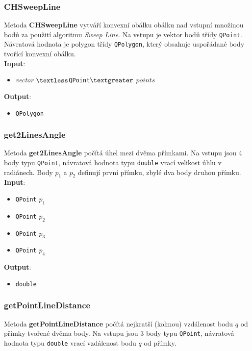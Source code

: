 \documentclass[a4paper, 12pt]{article}
\begin{document}
\subsubsection*{CHSweepLine}
Metoda \textbf{CHSweepLine} vytváří konvexní obálku obálku nad vstupní množinou bodů za použití algoritmu \textit{Sweep Line}. Na vstupu je vektor bodů třídy \texttt{QPoint}. Návratová hodnota je polygon třídy \texttt{QPolygon}, který obsahuje uspořádané body tvořící konvexní obálku.\\

\textbf{Input}:
\begin{itemize}
\item \textsl{vector} $\textless$\texttt{QPoint}$\textgreater$ $points$
\end{itemize}

\textbf{Output}:
\begin{itemize}
\item \texttt{QPolygon}
\end{itemize}

\subsubsection*{get2LinesAngle}
Metoda \textbf{get2LinesAngle} počítá úhel mezi dvěma přímkami. Na vstupu jsou 4 body typu \texttt{QPoint}, návratová hodnota typu \texttt{double} vrací velikost úhlu v radiánech. Body $p_1$ a $p_2$ definují první přímku, zbylé dva body druhou přímku.\\

\textbf{Input}:
\begin{itemize}
\item \texttt{QPoint} $p_1$ 
\item \texttt{QPoint} $p_2$ 
\item \texttt{QPoint} $p_3$
\item \texttt{QPoint} $p_4$
\end{itemize}

\textbf{Output}:
\begin{itemize}
\item \texttt{double} 
\end{itemize}

\subsubsection*{getPointLineDistance}
Metoda \textbf{getPointLineDistance} počítá nejkratší (kolmou) vzdálenost bodu $q$ od přímky tvořené dvěma body. Na vstupu jsou 3 body typu \texttt{QPoint}, návratová hodnota typu \texttt{double} vrací vzdálenost bodu $q$ od přímky.\\ 
\end{document}

